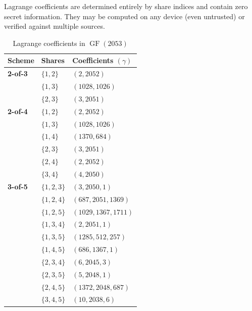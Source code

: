 \documentclass[11pt]{article}
\newcommand{\GF}{\operatorname{GF}}
\begin{document}
Lagrange coefficients are determined entirely by share indices and contain zero secret information. They may be computed on any device (even untrusted) or verified against multiple sources.

\begin{table}[ht!]
\centering
\caption{Lagrange coefficients in $\GF(2053)$}
\label{tab:lagrange}
\small
\begin{tabular}{@{}llp{4.5cm}@{}}
\toprule
\textbf{Scheme} & \textbf{Shares} & \textbf{Coefficients $(\gamma)$} \\ \midrule
\textbf{2-of-3} & $\{1, 2\}$ & $(2, 2052)$ \\
                & $\{1, 3\}$ & $(1028, 1026)$ \\
                & $\{2, 3\}$ & $(3, 2051)$ \\ \midrule
\textbf{2-of-4} & $\{1, 2\}$ & $(2, 2052)$ \\
                & $\{1, 3\}$ & $(1028, 1026)$ \\
                & $\{1, 4\}$ & $(1370, 684)$ \\
                & $\{2, 3\}$ & $(3, 2051)$ \\
                & $\{2, 4\}$ & $(2, 2052)$ \\
                & $\{3, 4\}$ & $(4, 2050)$ \\ \midrule
\textbf{3-of-5} & $\{1, 2, 3\}$ & $(3, 2050, 1)$ \\
                & $\{1, 2, 4\}$ & $(687, 2051, 1369)$ \\
                & $\{1, 2, 5\}$ & $(1029, 1367, 1711)$ \\
                & $\{1, 3, 4\}$ & $(2, 2051, 1)$ \\
                & $\{1, 3, 5\}$ & $(1285, 512, 257)$ \\
                & $\{1, 4, 5\}$ & $(686, 1367, 1)$ \\
                & $\{2, 3, 4\}$ & $(6, 2045, 3)$ \\
                & $\{2, 3, 5\}$ & $(5, 2048, 1)$ \\
                & $\{2, 4, 5\}$ & $(1372, 2048, 687)$ \\
                & $\{3, 4, 5\}$ & $(10, 2038, 6)$ \\
\bottomrule
\end{tabular}
\end{table}
\end{document}
